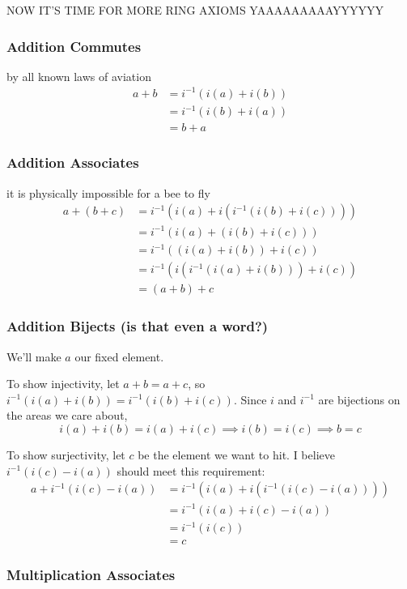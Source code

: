 \documentclass[12pt]{article}
\begin{document}
NOW IT'S TIME FOR MORE RING AXIOMS YAAAAAAAAAYYYYYY

\subsubsection{Addition Commutes}

by all known laws of aviation
\begin{align*}
  a+b
   & = i^{-1}(i(a)+i(b)) \\
   & = i^{-1}(i(b)+i(a)) \\
   & = b+a
\end{align*}

\subsubsection{Addition Associates}

it is physically impossible for a bee to fly
\begin{align*}
  a + (b + c)
   & = i^{-1}(i(a)+i(i^{-1}(i(b)+i(c)))) \\
   & = i^{-1}(i(a)+(i(b)+i(c)))          \\
   & = i^{-1}((i(a)+i(b))+i(c))          \\
   & = i^{-1}(i(i^{-1}(i(a)+i(b)))+i(c)) \\
   & = (a+b)+c
\end{align*}

\subsubsection{Addition Bijects (is that even a word?)}

We'll make $a$ our fixed element.

To show injectivity, let $a+b=a+c$, so $i^{-1}(i(a)+i(b))=i^{-1}(i(b)+i(c))$.
Since $i$ and $i^{-1}$ are bijections on the areas we care about,
\[i(a)+i(b)=i(a)+i(c) \implies i(b)=i(c) \implies b=c\]

To show surjectivity, let $c$ be the element we want to hit.
I believe $i^{-1}(i(c)-i(a))$ should meet this requirement:
\begin{align*}
  a+i^{-1}(i(c)-i(a))
   & = i^{-1}(i(a)+i(i^{-1}(i(c)-i(a)))) \\
   & = i^{-1}(i(a)+i(c)-i(a))            \\
   & = i^{-1}(i(c))                      \\
   & = c
\end{align*}

\subsubsection{Multiplication Associates}
\end{document}
